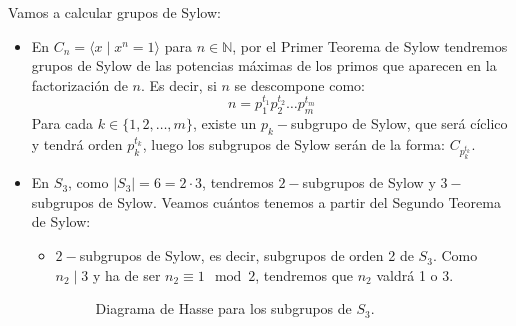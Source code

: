 \begin{ejemplo}
    Vamos a calcular grupos de Sylow:
    \begin{itemize}
        \item En $C_n = \langle x \mid x^n = 1 \rangle $ para $n\in \mathbb{N}$, por el Primer Teorema de Sylow tendremos grupos de Sylow de las potencias máximas de los primos que aparecen en la factorización de $n$. Es decir, si $n$ se descompone como:
            \begin{equation*}
                n = p_1^{t_1} p_2^{t_2} \ldots p_m^{t_m}
            \end{equation*}
            Para cada $k \in \{1,2,\ldots,m\}$, existe un $p_k-$subgrupo de Sylow, que será cíclico y tendrá orden $p_k^{t_k}$, luego los subgrupos de Sylow serán de la forma: $C_{p_k^{t_k}}$.
        \item En $S_3$, como $|S_3| = 6 = 2\cdot 3$, tendremos $2-$subgrupos de Sylow y $3-$subgrupos de Sylow. Veamos cuántos tenemos a partir del Segundo Teorema de Sylow:
            \begin{itemize}
                \item $2-$subgrupos de Sylow, es decir, subgrupos de orden 2 de $S_3$. Como $n_2 \mid 3$ y ha de ser $n_2\equiv 1 \mod 2$, tendremos que $n_2$ valdrá 1 o 3.

                    \begin{figure}[H]
                        \centering
                        \caption{Diagrama de Hasse para los subgrupos de $S_3$.}
                    \end{figure}


\end{itemize}
\end{itemize}
\end{ejemplo}

